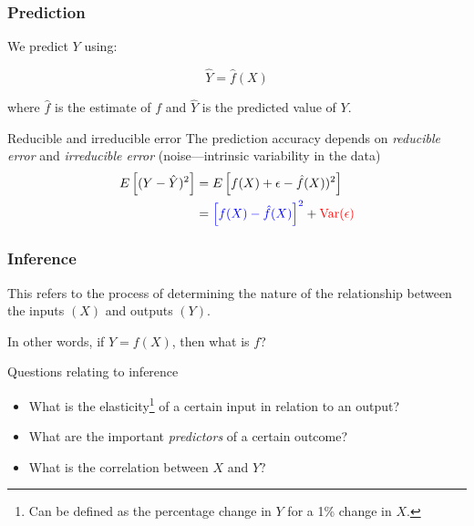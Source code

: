 \documentclass[usenames,dvipsnames,smaller]{beamer}
\newcommand{\lt}{\left}
\newcommand{\rt}{\right}
\newcommand{\?}{\stackrel{?}{=}}
\newcommand{\rd}{\color{red}}
\newcommand{\bl}{\color{blue}}
\begin{document}
\begin{frame}
  \frametitle{Prediction}
  We predict $Y$ using:

  \begin{equation}
    \label{eq:0}
    \hat Y = \hat f(X)
  \end{equation}
  \pause

  where $\hat f$ is the estimate of $f$ and $\hat Y$ is the predicted value of $Y$.

  \pause

  \begin{block}{Reducible and irreducible error}
    The prediction accuracy depends on \textit{\bl reducible error} and \textit{\rd irreducible error} (noise---intrinsic variability in the data)
    \begin{align}
      \begin{split}
        E\lt[(Y - \hat Y)^2\rt] &= E\lt[f(X) + \epsilon - \hat f (X))^2\rt] \\
        &= {\bl \lt[f(X) - \hat f(X)\rt]^2 } + {\rd \text{Var}(\epsilon)}
      \end{split}
    \end{align}
  \end{block}
\end{frame}
\begin{frame}
  \frametitle{Inference}
  This refers to the process of determining the nature of the relationship between the inputs $(X)$ and outputs $(Y)$.

  In other words, if $Y = f(X)$, then what is $f$? \pause

  \begin{exampleblock}{Questions relating to inference}
    \begin{itemize}[<+->]
    \item What is the elasticity\footnote{Can be defined as the percentage change in $Y$ for a 1\% change in $X$.} of a certain input in relation to an output?
    \item What are the important \textit{predictors} of a certain outcome?
    \item What is the correlation between $X$ and $Y$?
    \end{itemize}
  \end{exampleblock}
\end{frame}
\end{document}

